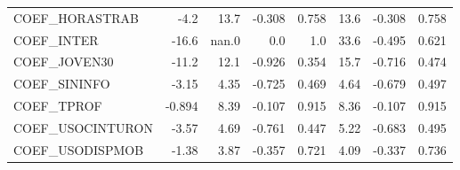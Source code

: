 \begin{tabular}{lrrrrrrr}
COEF\_HORASTRAB   &   -4.2 &     13.7 &    -0.308 &    0.758 &          13.6 &       -0.308 &         0.758 \\
COEF\_INTER       &  -16.6 &    nan.0 &       0.0 &      1.0 &          33.6 &       -0.495 &         0.621 \\
COEF\_JOVEN30     &  -11.2 &     12.1 &    -0.926 &    0.354 &          15.7 &       -0.716 &         0.474 \\
COEF\_SININFO     &  -3.15 &     4.35 &    -0.725 &    0.469 &          4.64 &       -0.679 &         0.497 \\
COEF\_TPROF       & -0.894 &     8.39 &    -0.107 &    0.915 &          8.36 &       -0.107 &         0.915 \\
COEF\_USOCINTURON &  -3.57 &     4.69 &    -0.761 &    0.447 &          5.22 &       -0.683 &         0.495 \\
COEF\_USODISPMOB  &  -1.38 &     3.87 &    -0.357 &    0.721 &          4.09 &       -0.337 &         0.736 \\
\bottomrule
\end{tabular}

